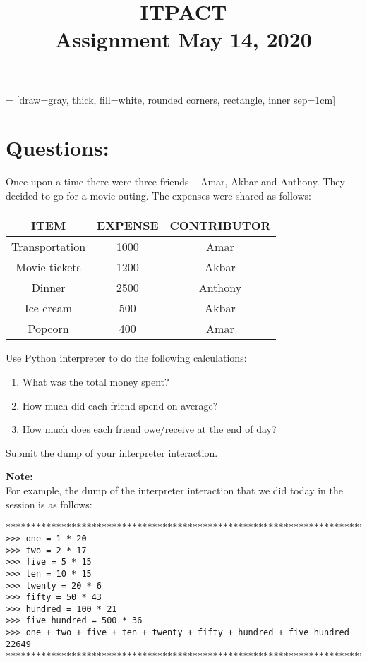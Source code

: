 \documentclass[addpoints,11pt]{exam}
\author{}
\title{ITPACT \\ Assignment May 14, 2020}
\date{}
\begin{document}
   = [draw=gray, thick, fill=white, rounded corners, rectangle, inner sep=1cm]
\maketitle

\pointsinrightmargin

\thispagestyle{head}

\section*{Questions:}

\begin{questions}

\question
Once upon a time there were three friends -- Amar, Akbar and Anthony.
They decided to go for a movie outing. The expenses were shared as follows:

\begin{center}
\begin{tabular}{ccc}
\hline
  ITEM         & EXPENSE   &       CONTRIBUTOR \\
\hline
Transportation &     1000  &           Amar    \\
Movie tickets  &     1200  &           Akbar   \\
Dinner         &     2500  &           Anthony \\
Ice cream      &      500  &           Akbar   \\
Popcorn        &      400  &           Amar  \\
\hline
\end{tabular}
\end{center}

Use Python interpreter to do the following calculations:
\begin{enumerate}
\item What was the total money spent?
\item How much did each friend spend on average?
\item How much does each friend owe/receive at the end of day?
\end{enumerate}

Submit the dump of your interpreter interaction.


\textbf{\color{BrickRed}Note:} \\
For example, the dump of the interpreter interaction that we did today in the
session is as follows:
\begin{lstlisting}[style=oc]
*******************************************************************************
>>> one = 1 * 20
>>> two = 2 * 17
>>> five = 5 * 15
>>> ten = 10 * 15
>>> twenty = 20 * 6
>>> fifty = 50 * 43
>>> hundred = 100 * 21
>>> five_hundred = 500 * 36
>>> one + two + five + ten + twenty + fifty + hundred + five_hundred
22649
*******************************************************************************
\end{lstlisting}

\end{questions}
\end{document}

